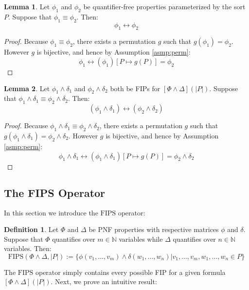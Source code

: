 \documentclass[12pt]{article}
\theoremstyle{definition}
\newtheorem{lemma}{Lemma}
\newtheorem{definition}{Definition}
\theoremstyle{remark}
\newcommand{\fips}{\text{FIPS}}
\begin{document}
\begin{lemma}
  \label{lem:phi-eqiv-bijec}
  Let $\phi_1$ and $\phi_2$ be quantifier-free properties parameterized by the sort $P$.  Suppose that $\phi_1 \equiv \phi_2$.  Then:
  $$\phi_1 \leftrightarrow \phi_2$$
\end{lemma}
\begin{proof}
  Because $\phi_1 \equiv \phi_2$, there exists a permutation $g$ such that $g(\phi_1) = \phi_2$.  However $g$ is bijective, and hence by Assumption \ref{asmp:perm}:
  $$\phi_1 \leftrightarrow (\phi_1)[P \mapsto g(P)] = \phi_2$$
\end{proof}

\begin{lemma}
  \label{lem:fip-eqiv-bijec}
  Let $\phi_1\land\delta_1$ and $\phi_2\land\delta_2$ both be FIPs for $[\Phi\land\Delta](|P|)$.  Suppose that $\phi_1\land\delta_1 \equiv \phi_2\land\delta_2$.  Then:
  $$(\phi_1 \land \delta_1) \leftrightarrow (\phi_2 \land \delta_2)$$
\end{lemma}
\begin{proof}
  Because $\phi_1\land\delta_1 \equiv \phi_2\land\delta_2$, there exists a permutation $g$ such that $g(\phi_1\land\delta_1) = \phi_2\land\delta_2$.  However $g$ is bijective, and hence by Assumption \ref{asmp:perm}:
  $$\phi_1\land\delta_1 \leftrightarrow (\phi_1\land\delta_1)[P \mapsto g(P)] = \phi_2\land\delta_2$$
\end{proof}

\subsection{The FIPS Operator}

In this section we introduce the $\fips$ operator:
\begin{definition}
  Let $\Phi$ and $\Delta$ be PNF properties with respective matrices $\phi$ and $\delta$.  Suppose that $\Phi$ quantifies over $m \in \mathbb{N}$ variables while $\Delta$ quantifies over $n \in \mathbb{N}$ variables.  Then:
  $$\fips(\Phi \land \Delta, |P|) := \{\phi(v_1,...,v_m) \land \delta(w_1,...,w_n) | v_1,...,v_m,w_1,...,w_n \in P\}$$
\end{definition}

The $\fips$ operator simply contains every possible FIP for a given formula $[\Phi\land\Delta](|P|)$.  Next, we prove an intuitive result:
\end{document}
